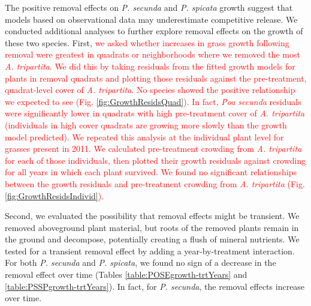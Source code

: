 \documentclass[11pt]{article}
\newcommand{\new}{\textcolor{red}}
\begin{document}
\begin{doublespacing}
The positive removal effects on \textit{P. secunda}  and \textit{P. spicata} growth suggest that models based on observational data may underestimate competitive release. We conducted additional analyses to further explore removal effects on the growth of these two species. First, \new{we asked whether increases in grass growth following removal were greatest in quadrats or neighborhoods where we removed the most \textit{A. tripartita}. We did this by taking residuals from the fitted growth models for plants in removal quadrats and plotting those residuals against the pre-treatment, quadrat-level cover of \textit{A. tripartita}. No species showed the positive relationship we expected to see (Fig. \ref{fig:GrowthResidsQuad}). In fact, \textit{Poa secunda} residuals were significantly lower in quadrats with high pre-treatment cover of \textit{A. tripartita} (individuals in high cover quadrats are growing more slowly than the growth model predicted). We repeated this analysis at the individual plant level for grasses present in 2011. We calculated pre-treatment crowding from \textit{A. tripartita} for each of those individuals, then plotted their growth residuals against crowding for all years in which each plant survived. We found no significant relationships between the growth residuals and pre-treatment crowding from \textit{A. tripartita} (Fig. \ref{fig:GrowthResidsIndivid}). }



Second, we evaluated the possibility that removal effects might be transient. We removed aboveground plant material, but roots of the removed plants remain in the ground and decompose, potentially creating a flush of mineral nutrients. We tested for a transient removal effect by adding a year-by-treatment interaction. For both  \textit{P. secunda}  and \textit{P. spicata}, we found no sign of a decrease in the removal effect over time (Tables \ref{table:POSEgrowth-trtYears} and \ref{table:PSSPgrowth-trtYears}). In fact, for  \textit{P. secunda}, the removal effects increase over time.


\end{doublespacing}
\end{document}
